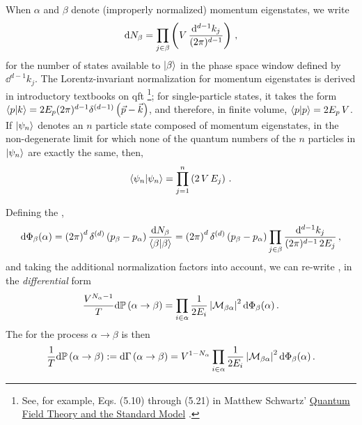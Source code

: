 When \(\alpha\) and \(\beta\) denote (improperly normalized) momentum eigenstates, we write
\begin{align}
    \dd N_\beta = \prod_{j \in \beta}\left(V \, \frac{\dd^{d-1} k_j}{(2\pi)^{d-1}}\right)
    \,,
\end{align}
for the number of states available to \(\ket{\beta}\) in the phase space window defined by \(\dd^{d-1} k_j\).
%
The Lorentz-invariant normalization for momentum eigenstates is derived in introductory textbooks on \gls{qft}%
\footnote{
    See, for example, Eqs. (5.10) through (5.21) in Matthew Schwartz' \underline{Quantum Field Theory and the Standard Model} \cite{Schwartz:2014sze}.
};
%
for single-particle states, it takes the form \(\braket{p}{k} = 2 E_p (2\pi)^{d-1} \delta^{(d-1)}\left(\vec{p} - \vec{k}\right)\), and therefore, in finite volume, \(\braket{p}{p} = 2 E_p \, V\).
%
If \(\ket{\psi_n}\) denotes an \(n\) particle state composed of momentum eigenstates, in the non-degenerate limit for which none of the quantum numbers of the \(n\) particles in \(\ket{\psi_n}\) are exactly the same, then,
\begin{align}
    \braket{\psi_n}{\psi_n}
    =
    \prod_{j = 1}^n \left(2 \, V\, E_j\right)
    \,.
\end{align}

Defining the ,
\begin{align}
   \dd\Phi_\beta(\alpha)
   =
   \left(2\pi\right)^d \delta^{(d)}\left(p_\beta - p_\alpha\right)
   \frac{\dd N_\beta}{\braket{\beta}{\beta}}
   =
   \left(2\pi\right)^d \delta^{(d)}\left(p_\beta - p_\alpha\right)
   \prod_{j \in \beta}
    \frac{\dd^{d-1} k_j}{(2\pi)^{d-1}\, 2 E_j}
   \,,
\end{align}
and taking the additional normalization factors into account, we can re-write , in the \textit{differential} form
\begin{align}
    \frac{V^{N_\alpha - 1}}{T}
    \dd \mathbb{P}\left(\alpha \to \beta\right)
    =
    \prod_{i \in \alpha} \frac{1}{2 E_i}
    \,
    \abs{\mathcal{M}_{\beta\alpha}}^2
    \,
    \dd \Phi_\beta(\alpha)
    \,.
\end{align}
The  for the process \(\alpha \to \beta\) is then
\begin{align}
    \label{eq:differential-rate}
    \frac{1}{T}
    \dd \mathbb{P}\le(\alpha \to \beta\ri)
    :=
    \dd \Gamma\le(\alpha \to \beta\ri)
    =
    V^{1 - N_{\alpha}}
    \prod_{i \in \alpha} \frac{1}{2 E_i}
    \,
    \abs{\mathcal{M}_{\beta\alpha}}^2
    \,
    \dd \Phi_\beta(\alpha)
    \,.
\end{align}



